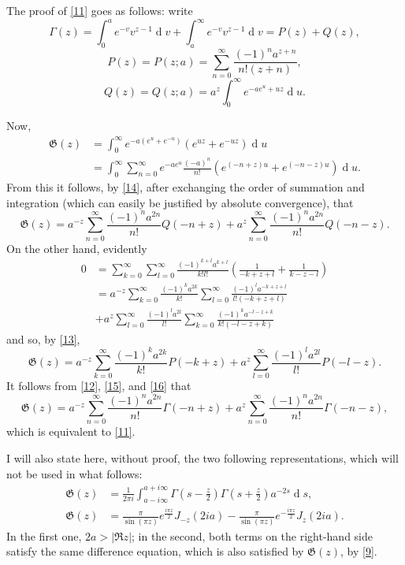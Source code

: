 \documentclass{article}
\theoremstyle{plain}
\newcommand{\dd}{\operatorname{d}\!}
\newcommand{\GG}{\mathfrak{G}}
\newcommand{\oldpage}[1]{\marginpar{\footnotesize$\Big\vert$ \textit{p.~#1}}}
\begin{document}
The proof of \cref{11} goes as follows: write
\[
\label{12}
  \Gamma(z)
  = \int_0^a e^{-v} v^{z-1} \dd v + \int_a^\infty e^{-v} v^{z-1} \dd v
  = P(z) + Q(z),
\tag{12}
\]
\[
\label{13}
  P(z) = P(z;a) = \sum_{n=0}^\infty \frac{(-1)^n a^{z+n}}{n!(z+n)},
\tag{13}
\]
\[
\label{14}
  Q(z) = Q(z;a) = a^z \int_0^\infty e^{-ae^u+uz} \dd u.
\tag{14}
\]

Now,
\[
  \begin{aligned}
    \GG(z)
    &= \int_0^\infty e^{-a(e^u+e^{-u})} (e^{uz}+e^{-uz}) \dd u
  \\&= \int_0^\infty \sum_{n=0}^\infty e^{-ae^u} \frac{(-a)^n}{n!} (e^{(-n+z)u}+e^{(-n-z)u}) \dd u.
  \end{aligned}
\]
From this it follows, by \cref{14}, after exchanging the order of summation and integration (which can easily be justified by absolute convergence), that
\oldpage{308}
\[
\label{15}
  \GG(z)
  = a^{-z}\sum_{n=0}^\infty \frac{(-1)^n a^{2n}}{n!} Q(-n+z)
  + a^z\sum_{n=0}^\infty \frac{(-1)^n a^{2n}}{n!} Q(-n-z).
\tag{15}
\]
On the other hand, evidently
\[
  \begin{aligned}
    0
    &= \sum_{k=0}^\infty \sum_{l=0}^\infty \frac{(-1)^{k+l}a^{k+l}}{k!l!} \left(
      \frac{1}{-k+z+l} + \frac{1}{k-z-l}
    \right)
  \\&= a^{-z} \sum_{k=0}^\infty \frac{(-1)^ka^{2k}}{k!} \sum_{l=0}^\infty \frac{(-1)^la^{-k+z+l}}{l!(-k+z+l)}
  \\&+ a^z \sum_{l=0}^\infty \frac{(-1)^la^{2l}}{l!} \sum_{k=0}^\infty \frac{(-1)^ka^{-l-z+k}}{k!(-l-z+k)}
  \end{aligned}
\]
and so, by \cref{13},
\[
\label{16}
  \GG(z)
  = a^{-z} \sum_{k=0}^\infty \frac{(-1)^ka^{2k}}{k!} P(-k+z)
  + a^z \sum_{l=0}^\infty \frac{(-1)^la^{2l}}{l!} P(-l-z).
\tag{16}
\]
It follows from \cref{12}, \cref{15}, and \cref{16} that
\[
  \GG(z)
  = a^{-z} \sum_{n=0}^\infty \frac{(-1)^na^{2n}}{n!} \Gamma(-n+z)
  + a^z \sum_{n=0}^\infty \frac{(-1)^na^{2n}}{n!} \Gamma(-n-z),
\]
which is equivalent to \cref{11}.

I will also state here, without proof, the two following representations, which will not be used in what follows:
\[
  \begin{aligned}
    \GG(z)
    &= \frac{1}{2\pi i} \int_{a-i\infty}^{a+i\infty} \Gamma\left(
      s - \frac{z}{2}
    \right) \Gamma \left(
      s + \frac{z}{2}
    \right) a^{-2s} \dd s,
  \\\GG(z)
    &= \frac{\pi}{\sin(\pi z)} e^{\frac{i\pi z}{2}} J_{-z}(2ia) - \frac{\pi}{\sin(\pi z)} e^{-\frac{i\pi z}{2}} J_z(2ia).
  \end{aligned}
\]
In the first one, $2a>|\Re z|$; in the second, both terms on the right-hand side satisfy the same difference equation, which is also satisfied by $\GG(z)$, by \cref{9}.
\end{document}
